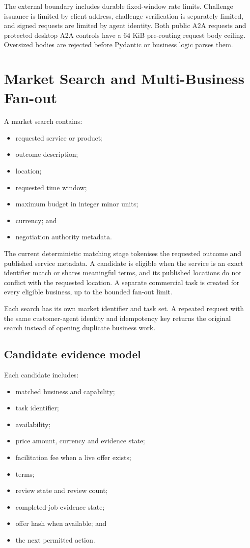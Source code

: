 \documentclass[11pt,a4paper]{article}
\begin{document}
The external boundary includes durable fixed-window rate limits.  Challenge
issuance is limited by client address, challenge verification is separately
limited, and signed requests are limited by agent identity.  Both public A2A
requests and protected desktop A2A controls have a 64 KiB pre-routing request
body ceiling.  Oversized bodies are rejected before Pydantic or business logic
parses them.

\section{Market Search and Multi-Business Fan-out}

A market search contains:

\begin{itemize}
  \item requested service or product;
  \item outcome description;
  \item location;
  \item requested time window;
  \item maximum budget in integer minor units;
  \item currency; and
  \item negotiation authority metadata.
\end{itemize}

The current deterministic matching stage tokenises the requested outcome and
published service metadata.  A candidate is eligible when the service is an
exact identifier match or shares meaningful terms, and its published locations
do not conflict with the requested location.  A separate commercial task is
created for every eligible business, up to the bounded fan-out limit.

Each search has its own market identifier and task set.  A repeated request
with the same customer-agent identity and idempotency key returns the original
search instead of opening duplicate business work.

\subsection{Candidate evidence model}

Each candidate includes:

\begin{itemize}
  \item matched business and capability;
  \item task identifier;
  \item availability;
  \item price amount, currency and evidence state;
  \item facilitation fee when a live offer exists;
  \item terms;
  \item review state and review count;
  \item completed-job evidence state;
  \item offer hash when available; and
  \item the next permitted action.
\end{itemize}
\end{document}
